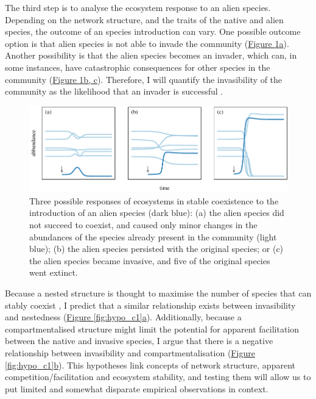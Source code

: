 \documentclass[a4paper]{article}
\begin{document}
The third step is to analyse the ecosystem response to an alien species.
Depending on the network structure, and the traits of the native and alien species, the outcome of an species introduction can vary.
One possible outcome option is that alien species is not able to invade the community (\hyperref[fig:dynamics]{Figure \ref{fig:dynamics}a}).
Another possibility is that the alien species becomes an invader, which can, in some instances, have catastrophic consequences for other species in the community (\hyperref[fig:dynamics]{Figure \ref{fig:dynamics}b, c}).
Therefore, I will quantify the invasibility of the community as the likelihood that an invader is successful \autocite{Ives2007, Romanuk2009}.

\begin{figure}[tbp]
  \includegraphics{dynamics}
  \caption{
  \label{fig:dynamics}
  Three possible responses of ecosystems in stable coexistence to the introduction of an alien species (dark blue):
  (a) the alien species did not succeed to coexist, and caused only minor changes in the abundances of the species already present in the community (light blue);
  (b) the alien species persisted with the original species; or
  (c) the alien species became invasive, and five of the original species went extinct.
  }
\end{figure}

Because a nested structure is thought to maximise the number of species that can stably coexist \autocite{Bastolla2009}, I predict that a similar relationship exists between invasibility and nestedness (\hyperref[fig:hypo_c1]{Figure \ref{fig:hypo_c1}a}).
Additionally, because a compartmentalised structure might limit the potential for apparent facilitation between the native and invasive species, I argue that there is a negative relationship between invasibility and compartmentalisation (\hyperref[fig:hypo_c1]{Figure \ref{fig:hypo_c1}b}).
This hypotheses link concepts of network structure, apparent competition/facilitation and ecosystem stability, and testing them will allow us to put limited and somewhat disparate empirical observations in context.
\end{document}
